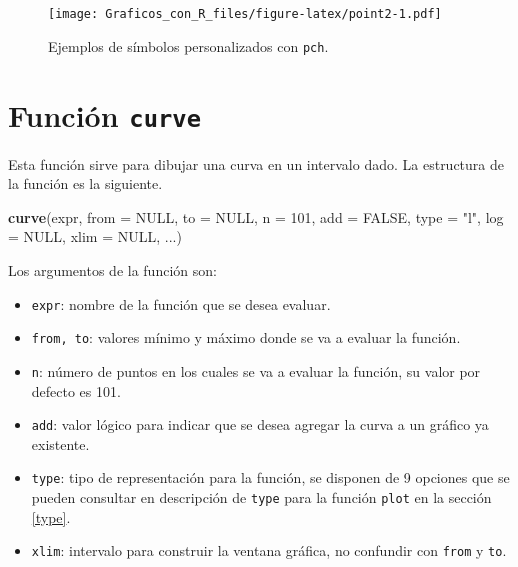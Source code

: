 \documentclass[10pt,]{krantz}
\makeatletter
\newenvironment{Shaded}{\begin{snugshade}}{\end{snugshade}}
\newcommand{\KeywordTok}[1]{\textcolor[rgb]{0.13,0.29,0.53}{\textbf{{#1}}}}
\newcommand{\DataTypeTok}[1]{\textcolor[rgb]{0.13,0.29,0.53}{{#1}}}
\newcommand{\DecValTok}[1]{\textcolor[rgb]{0.00,0.00,0.81}{{#1}}}
\newcommand{\StringTok}[1]{\textcolor[rgb]{0.31,0.60,0.02}{{#1}}}
\newcommand{\OtherTok}[1]{\textcolor[rgb]{0.56,0.35,0.01}{{#1}}}
\newcommand{\NormalTok}[1]{{#1}}
\providecommand{\tightlist}{%
  \setlength{\itemsep}{0pt}\setlength{\parskip}{0pt}}
\newenvironment{kframe}{%
\medskip{}
\setlength{\fboxsep}{.8em}
 \def\at@end@of@kframe{}%
 \ifinner\ifhmode%
  \def\at@end@of@kframe{\end{minipage}}%
  \begin{minipage}{\columnwidth}%
 \fi\fi%
 \def\FrameCommand##1{\hskip\@totalleftmargin \hskip-\fboxsep
 \colorbox{shadecolor}{##1}\hskip-\fboxsep
     \hskip-\linewidth \hskip-\@totalleftmargin \hskip\columnwidth}%
 \MakeFramed {\advance\hsize-\width
   \@totalleftmargin\z@ \linewidth\hsize
   \@setminipage}}%
 {\par\unskip\endMakeFramed%
 \at@end@of@kframe}
\renewenvironment{Shaded}{\begin{kframe}}{\end{kframe}}
\makeatother
\begin{document}
\begin{figure}[htbp]
\centering
\texttt{[image: Graficos\_con\_R\_files/figure-latex/point2-1.pdf]}
\caption{\label{fig:point2}Ejemplos de símbolos personalizados con
\texttt{pch}.}
\end{figure}

\section{\texorpdfstring{Función \texttt{curve} 
}{Función curve  }}\label{funcion-curve}

Esta función sirve para dibujar una curva en un intervalo dado. La
estructura de la función es la siguiente.

\begin{Shaded}
\begin{Highlighting}[]
\KeywordTok{curve}\NormalTok{(expr, }\DataTypeTok{from =} \OtherTok{NULL}\NormalTok{, }\DataTypeTok{to =} \OtherTok{NULL}\NormalTok{, }\DataTypeTok{n =} \DecValTok{101}\NormalTok{, }\DataTypeTok{add =} \OtherTok{FALSE}\NormalTok{,}
      \DataTypeTok{type =} \StringTok{"l"}\NormalTok{, }\DataTypeTok{log =} \OtherTok{NULL}\NormalTok{, }\DataTypeTok{xlim =} \OtherTok{NULL}\NormalTok{, ...)}
\end{Highlighting}
\end{Shaded}

Los argumentos de la función son:

\begin{itemize}
\tightlist
\item
  \texttt{expr}: nombre de la función que se desea evaluar.
\item
  \texttt{from,\ to}: valores mínimo y máximo donde se va a evaluar la
  función.
\item
  \texttt{n}: número de puntos en los cuales se va a evaluar la función,
  su valor por defecto es 101.
\item
  \texttt{add}: valor lógico para indicar que se desea agregar la curva
  a un gráfico ya existente.
\item
  \texttt{type}: tipo de representación para la función, se disponen de
  9 opciones que se pueden consultar en descripción de \texttt{type}
  para la función \texttt{plot} en la sección \ref{type}.
\item
  \texttt{xlim}: intervalo para construir la ventana gráfica, no
  confundir con \texttt{from} y \texttt{to}.
\end{itemize}
\end{document}
